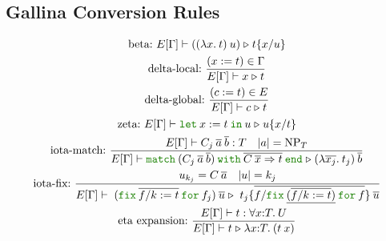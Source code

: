 \documentclass[a4paper,fleqn]{article}
\def\gallina{\textrm{Gallina}}
\newcommand{\kwlet}{\mbox{\color{mygreen}\ttfamily let}}
\newcommand{\kwin}{\mbox{\color{mygreen}\ttfamily in}}
\newcommand{\kwmatch}{\mbox{\color{mygreen}\ttfamily match}}
\newcommand{\kwwith}{\mbox{\color{mygreen}\ttfamily with}}
\newcommand{\kwend}{\mbox{\color{mygreen}\ttfamily end}}
\newcommand{\kwfix}{\mbox{\color{mygreen}\ttfamily fix}}
\newcommand{\kwfor}{\mbox{\color{mygreen}\ttfamily for}}
\newcommand{\lam}[2]{\lambda #1.\:#2}
\newcommand{\lamT}[3]{\lambda #1\mathord{:}#2.\:#3}
\newcommand{\prodT}[3]{\forall #1\mathord{:}#2.\:#3}
\newcommand{\letin}[3]{\kwlet\:#1:=#2\:\kwin\:#3}
\newcommand{\omatch}[2]{\kwmatch\:#1\:\kwwith\:{#2}\:\kwend}
\newcommand{\ofix}[2]{\kwfix\:{#1}\:\kwfor\:{#2}}
\DeclareMathOperator{\NP}{NP} %
\newcommand{\WT}[4]{\ensuremath{#1[#2] \vdash #3 : #4}}
\newcommand{\WTE}[3]{\WT{E}{#1}{#2}{#3}}
\newcommand{\WTEG}[2]{\WTE{\Gamma}{#1}{#2}}
\newcommand{\subst}[3]{#1\{#2/#3\}}
\newcommand{\substm}[3]{#1\{\overline{#2/#3}\}}
\newcommand{\reltri}{\mathrel{\triangleright}}
\begin{document}

\subsection{\gallina{} Conversion Rules}\label{sec:conversion-rules}

\begin{gather*}
  \text{beta:}~
    E[\Gamma] \vdash ((\lam{x}{t})\:u) \reltri \subst{t}{x}{u} \\
  \text{delta-local:}~
    \dfrac{(x:=t) \in \Gamma}{E[\Gamma] \vdash x \reltri t} \\
  \text{delta-global:}~
    \dfrac{(c:=t) \in E}{E[\Gamma] \vdash c \reltri t} \\
  \text{zeta:}~
    E[\Gamma] \vdash \letin{x}{t}{u} \reltri \subst{u}{x}{t} \\
  \text{iota-match:}~
    \dfrac
    {
      E[\Gamma] \vdash C_j\:\overline{a}\:\overline{b} : T \quad
      \text{$|a| = \NP_T$}
    }{
      E[\Gamma] \vdash
      \omatch{(C_j\:\overline{a}\:\overline{b})}{\overline{C\:\overline{x}\Rightarrow t}}
      \reltri
      (\lam{\overline{x_j}}{t_j})\:\overline{b}
    } \\
  \text{iota-fix:}~
    \dfrac{
      u_{k_j} = C\:\overline{a} \quad
      |u| = k_j
    }{
      E[\Gamma] \vdash\; (\ofix{\overline{f/k:=t}}{f_j})\:\overline{u} \reltri\; \substm{t_j}{f}{\ofix{\underline{(\overline{f/k:=t})}}{f}} \: \overline{u}
    } \\
  \text{eta expansion:}~
    \dfrac{\WTEG{t}{\prodT{x}{T}{U}}}{E[\Gamma] \vdash t \reltri \lamT{x}{T}{(t\:x)}}
\end{gather*}
\end{document}
